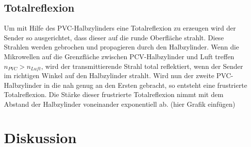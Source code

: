 \subsection{Totalreflexion}
Um mit Hilfe des PVC-Halbzylinders eine Totalreflexion zu erzeugen wird der Sender so ausgerichtet, dass dieser  auf die runde Oberfläche strahlt. Diese Strahlen werden gebrochen und propagieren durch den Halbzylinder.
Wenn die Mikrowellen auf die Grenzfläche zwischen PCV-Halbzylinder und Luft treffen $ n_{PVC}>n_{Luft} $, wird der transmittierende Strahl total reflektiert, wenn der Sender im richtigen Winkel auf den Halbzylinder strahlt.
Wird nun der zweite PVC-Halbzylinder in die nah genug an den Ersten gebracht, so entsteht eine frustrierte Totalreflexion.
Die Stärke dieser frustrierte Totalreflexion nimmt mit dem Abstand der Halbzylinder voneinander exponentiell ab.
(hier Grafik einfügen)


\newpage
\section{Diskussion} 